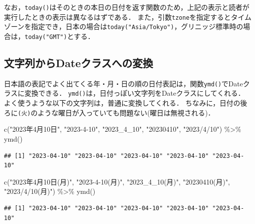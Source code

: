 \documentclass[
]{article}
\newenvironment{Shaded}{\begin{snugshade}}{\end{snugshade}}
\newcommand{\FunctionTok}[1]{\textcolor[rgb]{0.00,0.00,0.00}{#1}}
\newcommand{\NormalTok}[1]{#1}
\newcommand{\SpecialCharTok}[1]{\textcolor[rgb]{0.00,0.00,0.00}{#1}}
\newcommand{\StringTok}[1]{\textcolor[rgb]{0.31,0.60,0.02}{#1}}
\begin{document}
なお，\texttt{today()}はそのときの本日の日付を返す関数のため，上記の表示と読者が実行したときの表示は異なるはずである．
また，引数\texttt{tzone}を指定するとタイムゾーンを指定でき，日本の場合は\texttt{today("Asia/Tokyo")}，グリニッジ標準時の場合は，\texttt{today("GMT")}とする．

\hypertarget{ux6587ux5b57ux5217ux304bux3089dateux30afux30e9ux30b9ux3078ux306eux5909ux63db}{%
\subsection{文字列からDateクラスへの変換}\label{ux6587ux5b57ux5217ux304bux3089dateux30afux30e9ux30b9ux3078ux306eux5909ux63db}}

日本語の表記でよく出てくる年・月・日の順の日付表記は，関数\texttt{ymd()}でDateクラスに変換できる．
\texttt{ymd()}は，日付っぽい文字列をDateクラスにしてくれる．
よく使うような以下の文字列は，普通に変換してくれる．
ちなみに，日付の後ろに\texttt{(火)}のような曜日が入っていても問題ない(曜日は無視される)．

\begin{Shaded}
\begin{Highlighting}[]
\FunctionTok{c}\NormalTok{(}\StringTok{"2023年4月10日"}\NormalTok{, }\StringTok{"2023{-}4{-}10"}\NormalTok{, }\StringTok{"2023\_4\_10"}\NormalTok{, }\StringTok{"20230410"}\NormalTok{, }\StringTok{"2023/4/10"}\NormalTok{) }\SpecialCharTok{\%\textgreater{}\%}
  \FunctionTok{ymd}\NormalTok{()}
\end{Highlighting}
\end{Shaded}

\begin{verbatim}
## [1] "2023-04-10" "2023-04-10" "2023-04-10" "2023-04-10" "2023-04-10"
\end{verbatim}

\begin{Shaded}
\begin{Highlighting}[]
\FunctionTok{c}\NormalTok{(}\StringTok{"2023年4月10日(月)"}\NormalTok{, }\StringTok{"2023{-}4{-}10(月)"}\NormalTok{, }\StringTok{"2023\_4\_10(月)"}\NormalTok{, }\StringTok{"20230410(月)"}\NormalTok{, }\StringTok{"2023/4/10(月)"}\NormalTok{) }\SpecialCharTok{\%\textgreater{}\%}
  \FunctionTok{ymd}\NormalTok{()}
\end{Highlighting}
\end{Shaded}

\begin{verbatim}
## [1] "2023-04-10" "2023-04-10" "2023-04-10" "2023-04-10" "2023-04-10"
\end{verbatim}
\end{document}
